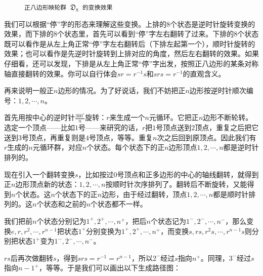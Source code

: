 \documentclass[12pt,UTF8,fontset=none]{ctexbook}
\newcommand{\heiti}{\CJKfamily{hattei}} %
\begin{document}
\begin{figure}[htbp]
    \caption{\texttt{正八边形映轮群 $\mathfrak{D}_8$ 的变换效果}}
    \label{fig:D8TransformEffect}
\end{figure}

我们可以根据“停”字的形态来理解这些变换。上排的$8$个状态是逆时针旋转变换的效果，而下排的$8$个状态里，首先可以看到“停”字左右翻转了过来。下排的$8$个状态既可以看作是从左上角正常“停”字左右翻转后（下排左起第一个），顺时针旋转的效果；也可以看作是先逆时针旋转到上排对应的角度，然后左右翻转的效果。如果仔细看，还可以发现，下排是从左上角正常“停”字出发，按照正八边形的某条对称轴直接翻转的效果。你可以自行体会$sr = r^{-1}s$和$srs = r^{-1}$的直观含义。

再来说明一般正$n$边形的情况。为了好说话，我们不妨把正$n$边形按逆时针顺次编号：$1,2,\cdots,n$。

首先用按中心的逆时针$\frac{360^\circ}{n}$旋转：$r$来生成一个$n$元循环。它把正$n$边形不断轮转。选定一个顶点——比如$1$号——来研究的话，$r$把$1$号顶点送到$2$顶点，重复之后把它送到$3$号顶点，再重复则是$4$号顶点，等等。重复$n$次之后回到原顶点。因此我们有$r$生成的$n$元循环群，对应$n$个状态。每个状态下的正$n$边形顶点$1,2,\cdots,n$都是逆时针排列的。

现在引入一个翻转变换$s$，比如按过$0$号顶点和正多边形的中心的轴线翻转，就得到正$n$边形顶点新的状态：$1,2,\cdots,n$按顺时针次序排列了。翻转后不断旋转，又能得到$n$个状态。这$n$个状态下的正$n$边形，由于经过翻转，顶点$1,2,\cdots,n$都是顺时针排列的。这$n$个状态和之前的$n$个状态都不一样。

我们把前$n$个状态分别记为$1^+,2^+,\cdots,n^+$，把后$n$个状态记为$1^-,2^-,\cdots,n^-$，那么变换$e,r,r^2,\cdots,r^{n-1}$把状态$1^+$分别变换为$1^+,2^+,\cdots,n^+$，而变换$s, rs, r^2s,\cdots, r^{n-1}s$则分别把状态$1^+$变为$1^-,2^-,\cdots,n^-$。

$rs$后再次做翻转$s$，得到$srs = r^{-1} = r^{n-1}$，所以$2^-$经过$s$指向$n^+$。同理，$3^-$经过$s$指向$n-1^+$，等等。于是我们可以画出以下生成路径图：
\end{document}
